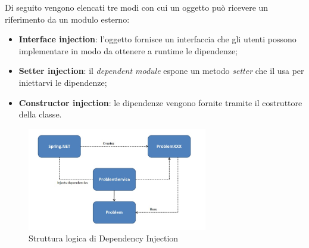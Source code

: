 Di seguito vengono elencati tre modi con cui un oggetto può ricevere un riferimento da un modulo esterno:

\begin{itemize}

	\item \textbf{Interface injection}: l'oggetto fornisce un interfaccia che gli utenti possono implementare in modo da ottenere a runtime le dipendenze;
	\item \textbf{Setter injection}: il \textit{dependent module} espone un metodo \textit{setter} che il  usa per iniettarvi le dipendenze;
	\item \textbf{Constructor injection}: le dipendenze vengono fornite tramite il costruttore della classe.

\end{itemize}

\begin{figure}[h]
\centering \includegraphics[width=0.7\textwidth]{patterns/dependency-injection.jpg}
\caption{Struttura logica di Dependency Injection}
\label{fig:strategy}
\end{figure}

